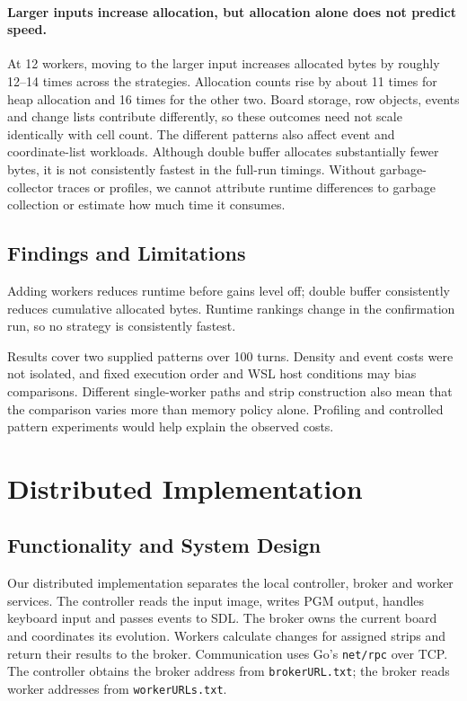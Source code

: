 \documentclass[10pt,a4paper,twocolumn]{article}
\begin{document}
\paragraph{Larger inputs increase allocation, but allocation alone does not predict speed.}
At 12 workers, moving to the larger input increases allocated bytes by
roughly 12--14 times across the strategies. Allocation counts rise by about
11 times for heap allocation and 16 times for the other two. Board storage,
row objects, events and change lists contribute differently, so these
outcomes need not scale identically with cell count. The different patterns
also affect event and coordinate-list workloads. Although double buffer
allocates substantially fewer bytes, it is not consistently fastest in the
full-run timings. Without garbage-collector traces or profiles, we cannot
attribute runtime differences to garbage collection or estimate how much
time it consumes.

\subsection{Findings and Limitations}

Adding workers reduces runtime before gains level off; double buffer
consistently reduces cumulative allocated bytes. Runtime rankings change in
the confirmation run, so no strategy is consistently fastest.

Results cover two supplied patterns over 100 turns. Density and event costs
were not isolated, and fixed execution order and WSL host conditions may bias
comparisons. Different single-worker paths and strip construction also mean
that the comparison varies more than memory policy alone. Profiling and
controlled pattern experiments would help explain the observed costs.

\section{Distributed Implementation}

\subsection{Functionality and System Design}

Our distributed implementation separates the local controller, broker and
worker services. The controller reads the input image, writes PGM output,
handles keyboard input and passes events to SDL. The broker owns the current
board and coordinates its evolution. Workers calculate changes for assigned
strips and return their results to the broker. Communication uses Go's
\texttt{net/rpc} over TCP. The controller obtains the broker address from
\texttt{brokerURL.txt}; the broker reads worker addresses from
\texttt{workerURLs.txt}.
\end{document}
